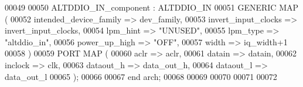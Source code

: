 \begin{DoxyCode}
00049 
00050     ALTDDIO\_IN\_component : ALTDDIO\_IN
00051     \textcolor{keywordflow}{GENERIC} \textcolor{keywordflow}{MAP} (
00052         intended\_device\_family  => dev_family,
00053         invert\_input\_clocks         => invert_input_clocks,
00054         lpm\_hint                    => \textcolor{keyword}{"UNUSED"},
00055         lpm\_type                    => \textcolor{keyword}{"altddio\_in"},
00056         power\_up\_high               => \textcolor{keyword}{"OFF"},
00057         width                       => iq\_width+1
00058     \textcolor{vhdlchar}{)}
00059     \textcolor{keywordflow}{PORT} \textcolor{keywordflow}{MAP} (
00060         aclr            => aclr,
00061         datain      => datain,
00062         inclock         => clk,
00063         dataout\_h   => data_out_h,
00064         dataout\_l   => data_out_l
00065     \textcolor{vhdlchar}{)};
00066   
00067 \textcolor{keywordflow}{end} \textcolor{vhdlchar}{arch};   
00068 
00069 
00070 
00071 
00072 
\end{DoxyCode}
